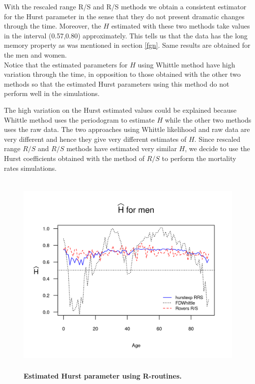 \documentclass[smallextended]{svjour3}
\begin{document}
With the rescaled range R/S and R/S  methods we obtain a consistent estimator
for the Hurst
parameter in the sense that they do not present dramatic changes through the
time. Moreover,
the $H$ estimated with these two methods take values in the interval
(0.57,0.80) approximately. This tells us that the data has the long memory
property as
was mentioned in section \ref{fgn}. Same results are obtained for the men and
women.\\


Notice that the estimated parameters for $H$ using Whittle method have high
variation through the time, in opposition to those
obtained with the other two methods so that the estimated
Hurst parameters using this method do not perform well in the simulations.

The high variation on the Hurst estimated values could be explained because
Whittle method uses
the periodogram to estimate $H$ while the other two methods uses the raw data.
The two approaches using Whittle likelihood and raw data are very different and
hence they give very different estimates of $H$. Since rescaled range $R/S$ and
$R/S$  methods have estimated very similar $H$, we decide to use the Hurst
coefficients obtained with the
method of $R/S$ to perform the mortality rates simulations. \\

\begin{figure}[H]
    \includegraphics[width = 4.5in, height=4in]{Hurst-Men.png}
    \caption{\bf Estimated Hurst parameter using R-routines.}
    \label{graph-Hurst_Est_Me}
\end{figure}\vspace*{0.1cm}
\end{document}

